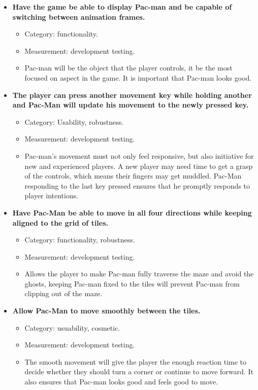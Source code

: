 \documentclass[letterpaper, 11pt]{article}
\begin{document}
\begin{itemize}
\item \textbf{Have the game be able to display Pac-man and be capable of switching between animation frames.}
\begin{itemize}
\item Category: functionality.
\item Measurement: development testing.
\item Pac-man will be the object that the player controls, it be the most focused on aspect in the game.
It is important that Pac-man looks good.
\end{itemize}
\end{itemize}


\begin{itemize}
\item \textbf{The player can press another movement key while holding another and Pac-Man will update his movement to the newly pressed key.}
\begin{itemize}
\item Category: Usability, robustness.
\item Measurement: development testing.
\item Pac-man’s movement must not only feel responsive, but also initiative for new and experienced players.
A new player may need time to get a grasp of the controls, which means their fingers may get muddled.
Pac-Man responding to the last key pressed ensures that he promptly responds to player intentions.
\end{itemize}
\end{itemize}


\begin{itemize}
\item \textbf{Have Pac-Man be able to move in all four directions while keeping aligned to the grid of tiles.}
\begin{itemize}
\item Category: functionality, robustness.
\item Measurement: development testing.
\item Allows the player to make Pac-man fully traverse the maze and avoid the ghosts, keeping Pac-man fixed to the tiles will prevent Pac-man from clipping out of the maze.
\end{itemize}
\end{itemize}


\begin{itemize}
\item \textbf{Allow Pac-Man to move smoothly between the tiles.}
\begin{itemize}
\item Category: usuability, cosmetic.
\item Measurement: development testing.
\item The smooth movement will give the player the enough reaction time to decide whether they should turn a corner or continue to move forward.
It also ensures that Pac-man looks good and feels good to move.
\end{itemize}
\end{itemize}

\printbibliography
\end{document}
